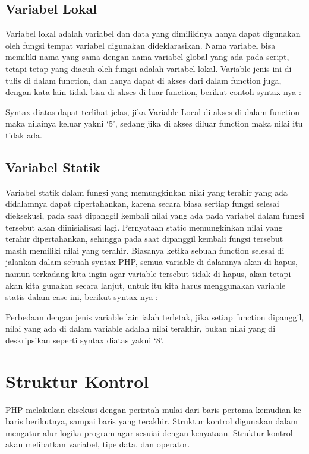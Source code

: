\subsection{Variabel Lokal}
Variabel lokal adalah variabel dan data yang dimilikinya hanya dapat digunakan oleh fungsi tempat variabel digunakan dideklarasikan.
Nama variabel bisa memiliki nama yang sama dengan nama variabel global yang ada pada script, tetapi tetap yang diacuh oleh fungsi adalah variabel lokal.
Variable jenis ini di tulis di dalam function, dan hanya dapat di akses dari dalam function juga, dengan kata lain tidak bisa di akses di luar function, berikut contoh syntax nya :

Syntax diatas dapat terlihat jelas, jika Variable Local di akses di dalam function maka nilainya keluar yakni ‘5’, sedang jika di akses diluar function maka nilai itu tidak ada.

\subsection{Variabel Statik}
Variabel statik dalam fungsi yang memungkinkan nilai yang terahir yang ada didalamnya dapat dipertahankan, karena secara biasa sertiap fungsi selesai dieksekusi, pada saat dipanggil kembali nilai yang ada pada variabel dalam fungsi tersebut akan diinisialisasi lagi. Pernyataan static memungkinkan nilai yang terahir dipertahankan, sehingga pada saat dipanggil kembali fungsi tersebut masih memiliki nilai yang terahir. Biasanya ketika sebuah function selesai di jalankan dalam sebuah syntax PHP, semua variable di dalamnya akan di hapus, namun terkadang kita ingin agar variable tersebut tidak di hapus, akan tetapi akan kita gunakan secara lanjut, untuk itu kita harus menggunakan variable statis dalam case ini, berikut syntax nya :

Perbedaan dengan jenis variable lain ialah terletak, jika setiap function dipanggil, nilai yang ada di dalam variable adalah nilai terakhir, bukan nilai yang di deskripsikan seperti syntax diatas yakni ‘8’.

\section{Struktur Kontrol}
PHP melakukan eksekusi dengan perintah mulai dari baris pertama kemudian ke baris berikutnya, sampai baris yang terakhir. Struktur kontrol digunakan dalam mengatur alur logika program agar sesuiai dengan kenyataan. Struktur kontrol akan melibatkan variabel, tipe data, dan operator. 
